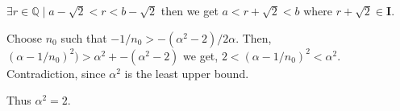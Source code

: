 \begin{solution}
  $\exists r \in \mathbb{Q} \mid a - \sqrt{2} < r < b - \sqrt{2}$ then we get
  $a < r + \sqrt{2} < b$ where $r + \sqrt{2} \in \mathbf{I}$.
\end{solution}

\begin{solution}
\end{solution}


\begin{solution}

  Choose $n_{0}$ such that $-1/n_{0} > -(\alpha^{2} - 2) / 2\alpha$.
  Then, $(\alpha - 1/n_{0})^{2}) > \alpha^{2} + -(\alpha^{2} - 2)$ we get,
  $2 < (\alpha - 1/n_{0})^{2} < \alpha^{2}$. Contradiction, since $\alpha^{2}$ is the least upper bound.

  Thus $\alpha^{2} = 2$.
\end{solution}

